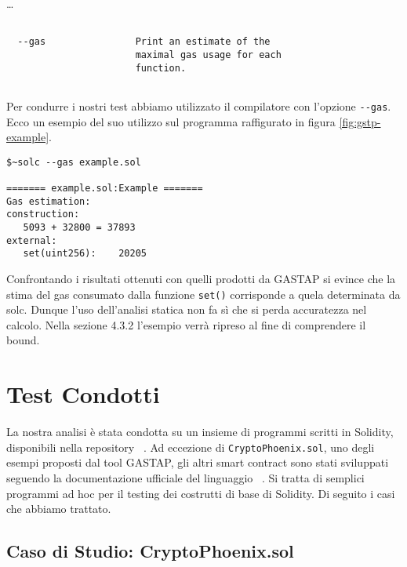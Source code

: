 \ldots

\begin{lstlisting}[frame=single, 
                    framerule=0pt]

  --gas                Print an estimate of the  
                       maximal gas usage for each 
                       function. 
 
\end{lstlisting}



Per condurre i nostri test abbiamo utilizzato il compilatore con l'opzione \verb|--gas|. Ecco un esempio del suo utilizzo sul programma raffigurato in figura \ref{fig:gstp-example}.

\begin{lstlisting}
$~solc --gas example.sol 

======= example.sol:Example =======
Gas estimation:
construction:
   5093 + 32800 = 37893
external:
   set(uint256):	20205

\end{lstlisting}

Confrontando i risultati ottenuti con quelli prodotti da GASTAP si evince che la stima del gas consumato dalla funzione \verb|set()| corrisponde a quela determinata da solc. Dunque l'uso dell'analisi statica non fa sì che si perda accuratezza nel calcolo.\newline
\indent Nella sezione 4.3.2 l'esempio verrà ripreso al fine di comprendere il bound.\newline


\section{Test Condotti}

La nostra analisi è stata condotta su un insieme di programmi scritti in Solidity, disponibili nella repository ~\cite{melastone-sc}.\newline
\indent Ad eccezione di \verb|CryptoPhoenix.sol|, uno degli esempi proposti dal tool GASTAP, gli altri smart contract sono stati sviluppati seguendo la documentazione ufficiale del linguaggio ~\cite{solidity-docs}. Si tratta di semplici programmi ad hoc per il testing dei costrutti di base di Solidity. Di seguito i casi che abbiamo trattato.\newline

    \subsection{Caso di Studio: CryptoPhoenix.sol}
    

